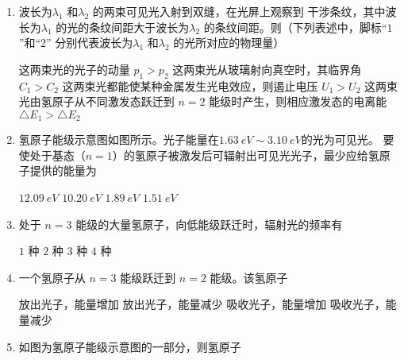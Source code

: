 

\begin{enumerate}
	\item
{}
波长为$ \lambda _{1} $ 和$ \lambda _{2} $ 的两束可见光入射到双缝，在光屏上观察到
干涉条纹，其中波长为$ \lambda _{1} $ 的光的条纹间距大于波长为$ \lambda _{2} $ 的条纹间距。则（下列表述中，脚标“$ 1 $”和“$ 2 $”
分别代表波长为$ \lambda _{1} $ 和$ \lambda _{2} $ 的光所对应的物理量）  

\fourchoices
{这两束光的光子的动量 $ p_{1}>p_{2} $}
{这两束光从玻璃射向真空时，其临界角 $ C_{1} > C_{2} $}
{这两束光都能使某种金属发生光电效应，则遏止电压 $ U_{1} > U_{2} $}
{这两束光由氢原子从不同激发态跃迁到 $ n=2 $ 能级时产生，则相应激发态的电离能$ \triangle E_{1} > \triangle E_{2} $}



\item 
{}
氢原子能级示意图如图所示。光子能量在$ 1.63 \ eV \sim 3.10 \ eV $的光为可见光。
要使处于基态（$ n=1 $）的氢原子被激发后可辐射出可见光光子，最少应给氢原子提供的能量为  
\begin{figure}[h!]
	\centering
	
\end{figure}


\fourchoices
{$ 12.09 \ eV $}
{$ 10.20 \ eV $}
{$ 1.89 \ eV $}
{$ 1.51 \ eV $}




\item 
{}
处于 $ n=3 $ 能级的大量氢原子，向低能级跃迁时，辐射光的频率有  

\fourchoices
{$ 1 $ 种}
{$ 2 $ 种}
{$ 3 $ 种}
{$ 4 $ 种}


\item 
{}
 一个氢原子从 $ n=3 $ 能级跃迁到 $ n=2 $ 能级。该氢原子  
 

\fourchoices
{放出光子，能量增加}
{放出光子，能量减少}
{吸收光子，能量增加}
{吸收光子，能量减少}


\item
{}
如图为氢原子能级示意图的一部分，则氢原子  
\begin{figure}[h!]
	\centering
	
\end{figure}



\end{enumerate}
